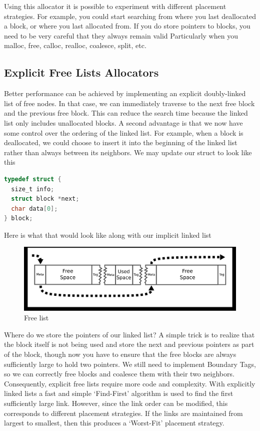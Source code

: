 Using this allocator it is possible to experiment with different placement strategies.
For example, you could start searching from where you last deallocated a block, or where you last allocated from.
If you do store pointers to blocks, you need to be very careful that they always remain valid
Particularly when you malloc, free, calloc, realloc, coalesce, split, etc.

\subsection{Explicit Free Lists Allocators}

Better performance can be achieved by implementing an explicit doubly-linked list of free nodes.
In that case, we can immediately traverse to the next free block and the previous free block.
This can reduce the search time because the linked list only includes unallocated blocks.
A second advantage is that we now have some control over the ordering of the linked list.
For example, when a block is deallocated, we could choose to insert it into the beginning of the linked list rather than always between its neighbors.
We may update our struct to look like this

\begin{lstlisting}[language=C]
typedef struct {
  size_t info;
  struct block *next;
  char data[0];
} block;
\end{lstlisting}

Here is what that would look like along with our implicit linked list

\begin{figure}[H]
\centering
\includegraphics[width=.7\textwidth]{malloc/drawings/free_list.eps}
\caption{Free list}
\end{figure}


Where do we store the pointers of our linked list?
A simple trick is to realize that the block itself is not being used and store the next and previous pointers as part of the block, though now you have to ensure that the free blocks are always sufficiently large to hold two pointers.
We still need to implement Boundary Tags, so we can correctly free blocks and coalesce them with their two neighbors.
Consequently, explicit free lists require more code and complexity.
With explicitly linked lists a fast and simple `Find-First' algorithm is used to find the first sufficiently large link.
However, since the link order can be modified, this corresponds to different placement strategies.
If the links are maintained from largest to smallest, then this produces a `Worst-Fit' placement strategy.

